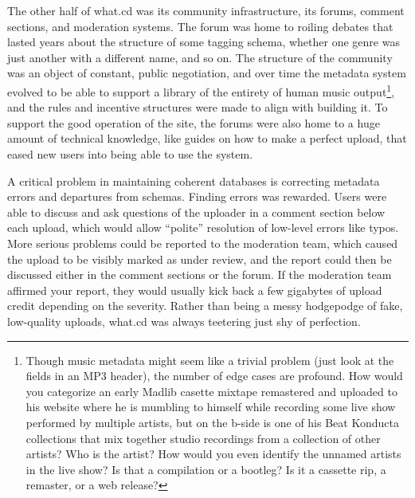 \documentclass{article}
\begin{document}
The other half of what.cd was its community infrastructure, its forums,
comment sections, and moderation systems. The forum was home to roiling
debates that lasted years about the structure of some tagging schema,
whether one genre was just another with a different name, and so on. The
structure of the community was an object of constant, public
negotiation, and over time the metadata system evolved to be able to
support a library of the entirety of human music output\footnote{Though
  music metadata might seem like a trivial problem (just look at the
  fields in an MP3 header), the number of edge cases are profound. How
  would you categorize an early Madlib casette mixtape remastered and
  uploaded to his website where he is mumbling to himself while
  recording some live show performed by multiple artists, but on the
  b-side is one of his Beat Konducta collections that mix together
  studio recordings from a collection of other artists? Who is the
  artist? How would you even identify the unnamed artists in the live
  show? Is that a compilation or a bootleg? Is it a cassette rip, a
  remaster, or a web release?}, and the rules and incentive structures
were made to align with building it. To support the good operation of
the site, the forums were also home to a huge amount of technical
knowledge, like guides on how to make a perfect upload, that eased new
users into being able to use the system.

A critical problem in maintaining coherent databases is correcting
metadata errors and departures from schemas. Finding errors was
rewarded. Users were able to discuss and ask questions of the uploader
in a comment section below each upload, which would allow ``polite''
resolution of low-level errors like typos. More serious problems could
be reported to the moderation team, which caused the upload to be
visibly marked as under review, and the report could then be discussed
either in the comment sections or the forum. If the moderation team
affirmed your report, they would usually kick back a few gigabytes of
upload credit depending on the severity. Rather than being a messy
hodgepodge of fake, low-quality uploads, what.cd was always teetering
just shy of perfection.
\end{document}
